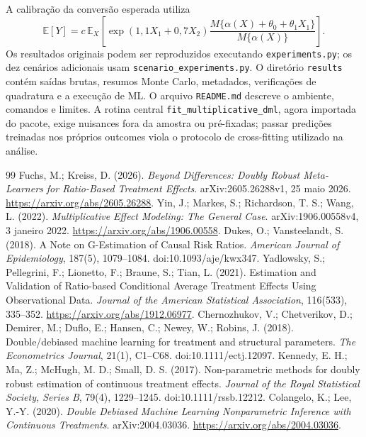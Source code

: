 \documentclass[11pt,a4paper]{article}
\newcommand{\E}{\mathbb E}
\begin{document}
A calibração da conversão esperada utiliza
\[
\E[Y]=c\,\E_X\left[\exp(1{,}1X_1+0{,}7X_2)
\frac{M\{\alpha(X)+\theta_0+\theta_1X_1\}}{M\{\alpha(X)\}}\right].
\]
Os resultados originais podem ser reproduzidos executando \texttt{experiments.py}; os dez cenários adicionais usam \texttt{scenario\_experiments.py}. O diretório \texttt{results} contém saídas brutas, resumos Monte Carlo, metadados, verificações de quadratura e a execução de ML. O arquivo \texttt{README.md} descreve o ambiente, comandos e limites. A rotina central \texttt{fit\_multiplicative\_dml}, agora importada do pacote, exige nuisances fora da amostra ou pré-fixadas; passar predições treinadas nos próprios outcomes viola o protocolo de cross-fitting utilizado na análise.



\begin{thebibliography}{99}
\small
\setlength{\itemsep}{2pt}
\setlength{\parskip}{0pt}
 Fuchs, M.; Kreiss, D. (2026). \emph{Beyond Differences: Doubly Robust Meta-Learners for Ratio-Based Treatment Effects}. arXiv:2605.26288v1, 25 maio 2026. \url{https://arxiv.org/abs/2605.26288}.
 Yin, J.; Markes, S.; Richardson, T. S.; Wang, L. (2022). \emph{Multiplicative Effect Modeling: The General Case}. arXiv:1906.00558v4, 3 janeiro 2022. \url{https://arxiv.org/abs/1906.00558}.
 Dukes, O.; Vansteelandt, S. (2018). A Note on G-Estimation of Causal Risk Ratios. \emph{American Journal of Epidemiology}, 187(5), 1079--1084. doi:10.1093/aje/kwx347.
 Yadlowsky, S.; Pellegrini, F.; Lionetto, F.; Braune, S.; Tian, L. (2021). Estimation and Validation of Ratio-based Conditional Average Treatment Effects Using Observational Data. \emph{Journal of the American Statistical Association}, 116(533), 335--352. \url{https://arxiv.org/abs/1912.06977}.
 Chernozhukov, V.; Chetverikov, D.; Demirer, M.; Duflo, E.; Hansen, C.; Newey, W.; Robins, J. (2018). Double/debiased machine learning for treatment and structural parameters. \emph{The Econometrics Journal}, 21(1), C1--C68. doi:10.1111/ectj.12097.
 Kennedy, E. H.; Ma, Z.; McHugh, M. D.; Small, D. S. (2017). Non-parametric methods for doubly robust estimation of continuous treatment effects. \emph{Journal of the Royal Statistical Society, Series B}, 79(4), 1229--1245. doi:10.1111/rssb.12212.
 Colangelo, K.; Lee, Y.-Y. (2020). \emph{Double Debiased Machine Learning Nonparametric Inference with Continuous Treatments}. arXiv:2004.03036. \url{https://arxiv.org/abs/2004.03036}.

\end{thebibliography}
\end{document}
